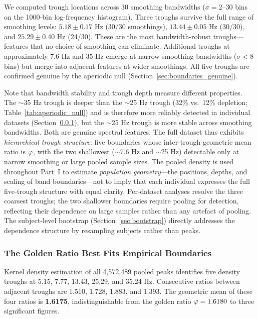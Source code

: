We computed trough locations across 30 smoothing bandwidths ($\sigma = 2$--30 bins on the 1000-bin log-frequency histogram). Three troughs survive the full range of smoothing levels: $5.18 \pm 0.17$ Hz (30/30 smoothings), $13.44 \pm 0.05$ Hz (30/30), and $25.29 \pm 0.40$ Hz (24/30). These are the most bandwidth-robust troughs---features that no choice of smoothing can eliminate. Additional troughs at approximately 7.6 Hz and 35 Hz emerge at narrow smoothing bandwidths ($\sigma < 8$ bins) but merge into adjacent features at wider smoothings. All five troughs are confirmed genuine by the aperiodic null (Section~\ref{sec:boundaries_genuine}).

Note that bandwidth stability and trough depth measure different properties. The $\sim$35 Hz trough is deeper than the $\sim$25 Hz trough (32\% vs.\ 12\% depletion; Table~\ref{tab:aperiodic_null}) and is therefore more reliably detected in individual datasets (Section~\ref{sec:goldenratio}), but the $\sim$25 Hz trough is more stable across smoothing bandwidths. Both are genuine spectral features. The full dataset thus exhibits \emph{hierarchical trough structure}: five boundaries whose inter-trough geometric mean ratio is $\varphi$, with the two shallowest ($\sim$7.6 Hz and $\sim$25 Hz) detectable only at narrow smoothing or large pooled sample sizes. The pooled density is used throughout Part~I to estimate \emph{population geometry}---the positions, depths, and scaling of band boundaries---not to imply that each individual expresses the full five-trough structure with equal clarity. Per-dataset analyses resolve the three coarsest troughs; the two shallower boundaries require pooling for detection, reflecting their dependence on large samples rather than any artefact of pooling. The subject-level bootstrap (Section~\ref{sec:bootstrap}) directly addresses the dependence structure by resampling subjects rather than peaks.

\subsubsection{The Golden Ratio Best Fits Empirical Boundaries}
\label{sec:goldenratio}

Kernel density estimation of all 4,572,489 pooled peaks identifies five density troughs at 5.15, 7.77, 13.43, 25.29, and 35.24 Hz. Consecutive ratios between adjacent troughs are 1.510, 1.728, 1.883, and 1.393. The geometric mean of these four ratios is \textbf{1.6175}, indistinguishable from the golden ratio $\varphi = 1.6180$ to three significant figures.

